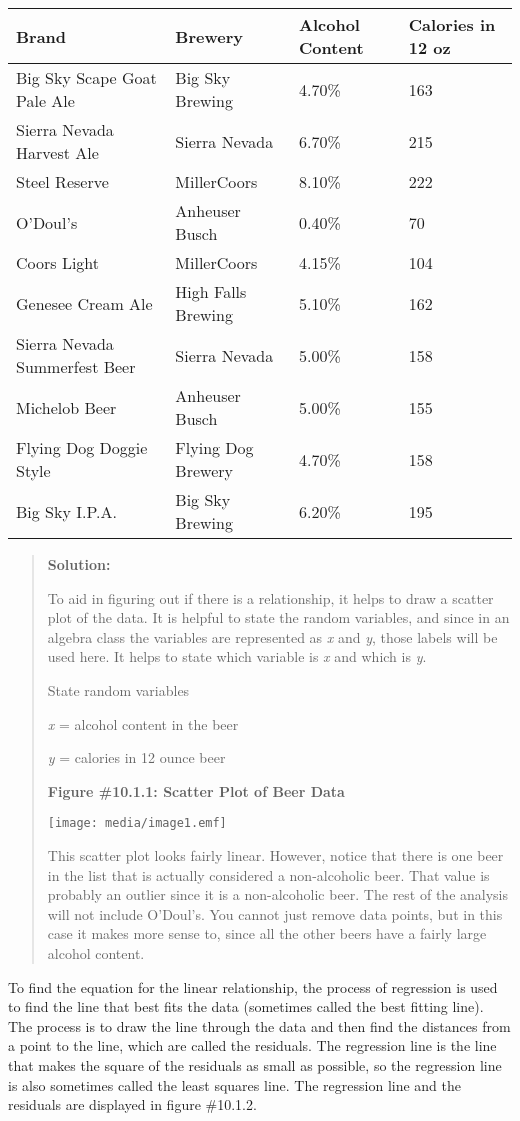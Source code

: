 \documentclass[]{book}
\begin{document}
\begin{longtable}[]{@{}llll@{}}
\toprule
Brand & Brewery & Alcohol Content & Calories in 12 oz\tabularnewline
\midrule
\endhead
Big Sky Scape Goat Pale Ale & Big Sky Brewing & 4.70\% & 163\tabularnewline
Sierra Nevada Harvest Ale & Sierra Nevada & 6.70\% & 215\tabularnewline
Steel Reserve & MillerCoors & 8.10\% & 222\tabularnewline
O'Doul's & Anheuser Busch & 0.40\% & 70\tabularnewline
Coors Light & MillerCoors & 4.15\% & 104\tabularnewline
Genesee Cream Ale & High Falls Brewing & 5.10\% & 162\tabularnewline
Sierra Nevada Summerfest Beer & Sierra Nevada & 5.00\% & 158\tabularnewline
Michelob Beer & Anheuser Busch & 5.00\% & 155\tabularnewline
Flying Dog Doggie Style & Flying Dog Brewery & 4.70\% & 158\tabularnewline
Big Sky I.P.A. & Big Sky Brewing & 6.20\% & 195\tabularnewline
\bottomrule
\end{longtable}

\begin{quote}
\textbf{Solution:}

To aid in figuring out if there is a relationship, it helps to draw a scatter plot of the data. It is helpful to state the random variables, and since in an algebra class the variables are represented as \emph{x} and \emph{y}, those labels will be used here. It helps to state which variable is \emph{x} and which is \emph{y}.

State random variables

\emph{x} = alcohol content in the beer

\emph{y} = calories in 12 ounce beer

\textbf{Figure \#10.1.1: Scatter Plot of Beer Data}

\texttt{[image: media/image1.emf]}

This scatter plot looks fairly linear. However, notice that there is one beer in the list that is actually considered a non-alcoholic beer. That value is probably an outlier since it is a non-alcoholic beer. The rest of the analysis will not include O'Doul's. You cannot just remove data points, but in this case it makes more sense to, since all the other beers have a fairly large alcohol content.
\end{quote}

To find the equation for the linear relationship, the process of regression is used to find the line that best fits the data (sometimes called the best fitting line). The process is to draw the line through the data and then find the distances from a point to the line, which are called the residuals. The regression line is the line that makes the square of the residuals as small as possible, so the regression line is also sometimes called the least squares line. The regression line and the residuals are displayed in figure \#10.1.2.
\end{document}
